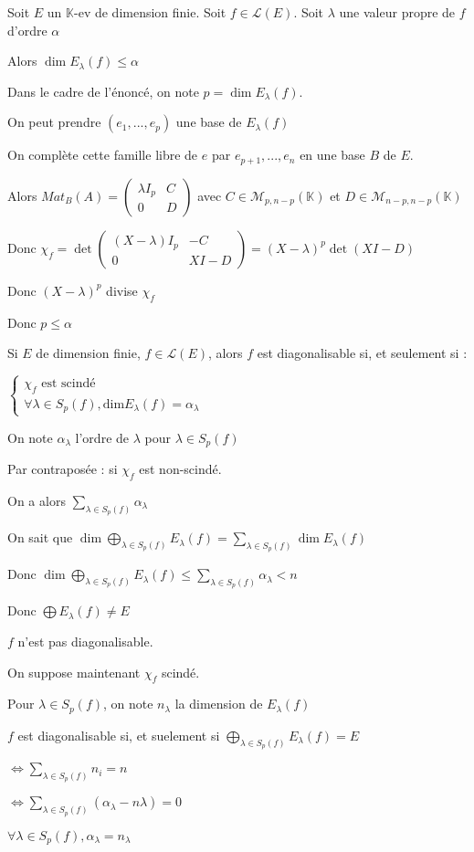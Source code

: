 \documentclass[a4paper,12pt]{book}
\newcommand{\Thr}[2]{\begin{tcolorbox}[sharp corners, colback=white,colframe=red!90!black!75, title=Théorème : #1]#2\end{tcolorbox}}
\newcommand{\Prop}[2]{\begin{tcolorbox}[sharp corners, colback=white,colframe=red!90!black!75, title=Proposition : #1]#2\end{tcolorbox}}
\newcommand{\Pre}[1]{\begin{tcolorbox}[sharp corners, colback=white,colframe=green!60!green!30!black!75, title=Preuve]#1\end{tcolorbox}}
\def\K{\mathbb{K}}
\begin{document}
\Thr{}{Soit $E$ un $\K$-ev de dimension finie. Soit $f\in\mathcal{L}(E)$. Soit $\lambda$ une valeur propre de $f$ d'ordre $\alpha$ \par Alors $\dim E_\lambda(f)\leq\alpha$}
\Pre{Dans le cadre de l'énoncé, on note $p=\dim E_\lambda(f)$. \par On peut prendre $(e_1,..., e_p)$ une base de $E_\lambda(f)$ \par On complète cette famille libre de $e$ par $e_{p+1}, ..., e_n$ en une base $B$ de $E$. \par Alors $Mat_B(A) = \begin{pmatrix} \lambda I_p & C\\ 0 & D\end{pmatrix}$ avec $C\in\mathcal{M}_{p,n-p}(\K)$ et $D\in\mathcal{M}_{n-p, n-p}(\K)$ \par Donc $\chi_f  = \det\begin{pmatrix}(X-\lambda)I_p & -C \\ 0 & XI-D \end{pmatrix} = (X-\lambda)^p\det(XI-D)$ \par Donc $(X-\lambda)^p$ divise $\chi_f$ \par Donc $p\leq\alpha$}
\Prop{Corollaire}{Si $E$ de dimension finie, $f\in\mathcal{L}(E)$, alors $f$ est diagonalisable si, et seulement si :
\par $\left\{\begin{array}{l} \chi_f\text{ est scindé} \\ \forall\lambda\in S_p(f), \mathrm{dim}E_\lambda(f)=\alpha_\lambda\end{array}\right.$}
\Pre{On note $\alpha_\lambda$ l'ordre de $\lambda$ pour $\lambda\in S_p(f)$ \par Par contraposée : si $\chi_f$ est non-scindé. \par On a alors $\sum\limits_{\lambda\in S_p(f)}\alpha_\lambda$ \par On sait que $\dim\bigoplus_{\lambda\in S_p(f)}E_\lambda(f)=\sum\limits_{\lambda\in S_p(f)}\dim E_\lambda(f)$ \par Donc $\dim\bigoplus_{\lambda\in S_p(f)}E_\lambda(f)\leq \sum\limits_{\lambda\in S_p(f)}\alpha_\lambda<n$ \par Donc $\bigoplus E_\lambda(f)\neq E$ \par $f$ n'est pas diagonalisable.
\par On suppose maintenant $\chi_f$ scindé. \par Pour $\lambda\in S_p(f)$, on note $n_\lambda$ la dimension de $E_\lambda(f)$ \par $f$ est diagonalisable si, et suelement si $\bigoplus\limits_{\lambda\in S_p(f)}E_\lambda(f)=E$ \par $\Leftrightarrow \sum\limits_{\lambda\in S_p(f)}n_i=n$ \par $\Leftrightarrow \sum\limits_{\lambda\in S_p(f)}(\alpha_\lambda-n\lambda)=0$ \par $\forall\lambda\in S_p(f),\alpha_\lambda=n_\lambda$}
\end{document}
